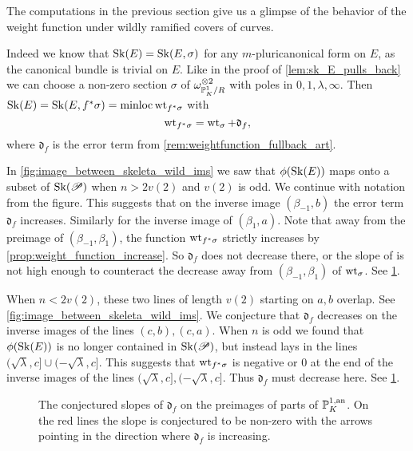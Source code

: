 The computations in the previous section give us a glimpse of the behavior of the weight function under wildly ramified covers of curves. 

Indeed we know that $\operatorname{Sk}(E) = \operatorname{Sk}(E, \sigma)$ for any $m$-pluricanonical form on $E$, as the canonical bundle is trivial on $E$. 
Like in the proof of \cref{lem:sk_E_pulls_back} we can choose a non-zero section $\sigma$ of $\omega_{\mathbb{P}^{1}_K  / R} ^{\otimes 2}$ with poles in $0, 1, \lambda, \infty$. 
Then $\operatorname{Sk}(E) = \operatorname{Sk}(E, f^*\sigma) = \operatorname{minloc} \operatorname{wt}_{f^* \sigma}$ with \[
\operatorname{wt}_{f^*\sigma} = \operatorname{wt}_{\sigma} + \mathfrak{d}_f
,\] 
where $\mathfrak{d}_f $ is the error term from \cref{rem:weightfunction_fullback_art}. 

In \cref{fig:image_between_skeleta_wild_ims} we saw that $\phi(\sk(E))$ maps onto a subset of  $\operatorname{Sk}(\mathscr P)$ when $n > 2v(2)$ and $v(2)$ is odd. We continue with notation from the figure.
This suggests that on the inverse image $(\beta_{-1}, b)$ the error term $\mathfrak{d}_f $ increases. 
Similarly for the inverse image of  $(\beta_1, a)$. 
Note that away from the preimage of $(\beta_{-1}, \beta_1)$, the function $\operatorname{wt}_{f^*\sigma}$ strictly increases by \cref{prop:weight_function_increase}.
So $\mathfrak{d} _f$ does not decrease there, or the slope of is not high enough to counteract the decrease away from $(\beta_{-1}, \beta_1)$ of $\operatorname{wt}_{\sigma}$. 
See \cref{fig:slope_log_different}.

When $n < 2v(2)$, these two lines of length $v(2)$ starting on $a, b$ overlap. See \cref{fig:image_between_skeleta_wild_ims}. 
We conjecture that $\mathfrak{d} _f$ decreases on the inverse images of the lines $(c, b), (c, a)$. 
When $n$ is odd we found that $\phi(\sk(E))$ is no longer contained in $\operatorname{Sk}(\mathscr P)$, but instead lays in the lines $(\sqrt{\lambda}, c]\cup (-\sqrt{\lambda} , c]  $. 
This suggests that $\operatorname{wt}_{f^*\sigma}$ is negative or 0 at the end of the inverse images of the lines $(\sqrt{\lambda}, c], (-\sqrt{\lambda}, c]$. 
Thus $\mathfrak{d} _f$ must decrease here. 
See \cref{fig:slope_log_different}.

\begin{figure}[ht]
    \centering
    \caption{The conjectured slopes of $\mathfrak{d} _f$ on the preimages of parts of $\mathbb{P}^{1, \text{an}}_K$.
    On the red lines the slope is conjectured to be non-zero with the arrows pointing in the direction where $\mathfrak{d}_f $ is increasing. }
    \label{fig:slope_log_different}
\end{figure}
